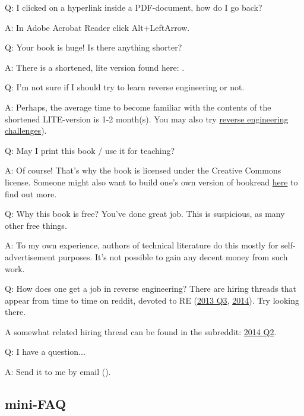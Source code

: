 \par Q: I clicked on a hyperlink inside a PDF-document, how do I go back?
\par A: In Adobe Acrobat Reader click Alt+LeftArrow.

\ifx\LITE\undefined
\par Q: Your book is huge! Is there anything shorter?
\par A: There is a shortened, lite version found here: \LITEURL{}.
\fi

\par Q: I'm not sure if I should try to learn reverse engineering or not.
\par A: Perhaps, the average time to become familiar with the contents of the shortened LITE-version is 1-2 month(s).
You may also try \href{http://challenges.re/}{reverse engineering challenges}).

\par Q: May I print this book / use it for teaching?
\par A: Of course! That's why the book is licensed under the Creative Commons license.
Someone might also want to build one's own version of book\textemdash{}read \href{\HACKINGMdURL}{here} to find out more.

\par Q: Why this book is free? You've done great job. This is suspicious, as many other free things.
\par A: To my own experience, authors of technical literature do this mostly for self-advertisement purposes. It's not possible to gain any decent money from such work.

\par Q: How does one get a job in reverse engineering?
There are hiring threads that appear from time to time on reddit, devoted to RE\FNURLREDDIT{}
(\href{http://go.yurichev.com/17333}{2013 Q3}, 
\href{http://go.yurichev.com/17334}{2014}).
Try looking there.

A somewhat related hiring thread can be found in the  subreddit:
\href{http://go.yurichev.com/17335}{2014 Q2}.

\par Q: I have a question...
\par A: Send it to me by email (\EMAIL).

\fi %

\ifdefined\SPANISH
\subsection*{mini-FAQ}

